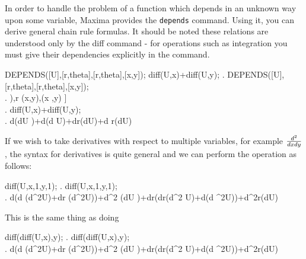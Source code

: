 In order to handle the problem of a function which depends
in an unknown way upon some variable, Maxima provides
the {\tt depends} command.  Using it, you can derive
general chain rule formulas.  It should be noted these
relations are understood only by the diff command - 
for operations such as integration you must give their 
dependencies explicitly in the command.

\beginmaximasession
DEPENDS([U],[r,theta],[r,theta],[x,y]);
diff(U,x)+diff(U,y);
\maximatexsession
{}.  DEPENDS([U],[r,theta],[r,theta],[x,y]); \\
.   \left[ U\left(r,\linebreak[0]\vartheta\right),\linebreak[0]r
 \left(x,\linebreak[0]y\right),\linebreak[0]\vartheta\left(x
 ,\linebreak[0]y\right) \right]  \\
.  diff(U,x)+diff(U,y); \\
.   {{d}}\*\vartheta\*\left({{d}}\*U
 \right)+{{d}}\*\vartheta\*\left({{d}}
 \*U\right)+{{d}}\*r\*\left({{d}}\*U\right)+{{d
 }}\*r\*\left({{d}}\*U\right) \\
\endmaximasession

If we wish to take derivatives with respect to multiple variables,
for example $d^2\over{dxdy}$, the syntax for derivatives is quite
general and we can perform the operation as follows:

\beginmaximasession
diff(U,x,1,y,1);
\maximatexsession
{}.  diff(U,x,1,y,1); \\
.   {{d}}\*\vartheta\*\left({{d}}\*\vartheta\*
 \left({{d^{2}}}\*U\right)+{{d}}\*r
 \*\left({{d^{2}}}\*U\right)\right)+{{d^{2}
 }}\*\vartheta\*\left({{d}}\*U
 \right)+{{d}}\*r\*\left({{d}}\*r\*\left({{d^{2
 }}}\*U\right)+{{d}}\*\vartheta\*\left({{d
 ^{2}}}\*U\right)\right)+{{d^{2}}}\*r\*\left({{d}}\*U\right) \\
\endmaximasession

This is the same thing as doing

\beginmaximasession
diff(diff(U,x),y);
\maximatexsession
{}.  diff(diff(U,x),y); \\
.   {{d}}\*\vartheta\*\left({{d}}\*\vartheta\*
 \left({{d^{2}}}\*U\right)+{{d}}\*r
 \*\left({{d^{2}}}\*U\right)\right)+{{d^{2}
 }}\*\vartheta\*\left({{d}}\*U
 \right)+{{d}}\*r\*\left({{d}}\*r\*\left({{d^{2
 }}}\*U\right)+{{d}}\*\vartheta\*\left({{d
 ^{2}}}\*U\right)\right)+{{d^{2}}}\*r\*\left({{d}}\*U\right) \\
\endmaximasession

